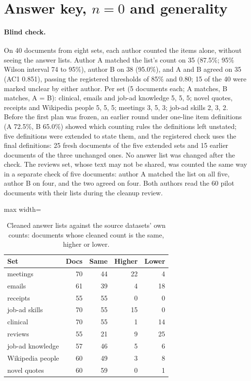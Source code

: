 \section{Answer key, $n = 0$ and generality}
\label{app:key}
\label{app:generality}

\paragraph{Blind check.}
On 40 documents from eight sets, each author counted the items alone, without seeing the answer lists.
Author A matched the list's count on 35 (87.5\%; 95\% Wilson interval 74 to 95\%), author B on 38 (95.0\%), and A and B agreed on 35 (AC1 0.851), passing the registered thresholds of 85\% and 0.80; 15 of the 40 were marked unclear by either author.
Per set (5 documents each; A matches, B matches, A = B): clinical, emails and job-ad knowledge 5, 5, 5; novel quotes, receipts and Wikipedia people 5, 5, 5; meetings 3, 5, 3; job-ad skills 2, 3, 2.
Before the first plan was frozen, an earlier round under one-line item definitions (A 72.5\%, B 65.0\%) showed which counting rules the definitions left unstated; five definitions were extended to state them, and the registered check uses the final definitions: 25 fresh documents of the five extended sets and 15 earlier documents of the three unchanged ones.
No answer list was changed after the check.
The reviews set, whose text may not be shared, was counted the same way in a separate check of five documents: author A matched the list on all five, author B on four, and the two agreed on four.
Both authors read the 60 pilot documents with their lists during the cleanup review.

\begin{table}[t]
  \centering
  \small
  \begin{adjustbox}{max width=\linewidth}
  \begin{tabular}{@{}lrrrr@{}}
    \toprule
    Set & Docs & Same & Higher & Lower \\
    \midrule
    meetings & 70 & 44 & 22 & 4 \\
    emails & 61 & 39 & 4 & 18 \\
    receipts & 55 & 55 & 0 & 0 \\
    job-ad skills & 70 & 55 & 15 & 0 \\
    clinical & 70 & 55 & 1 & 14 \\
    reviews & 55 & 21 & 9 & 25 \\
    job-ad knowledge & 57 & 46 & 5 & 6 \\
    Wikipedia people & 60 & 49 & 3 & 8 \\
    novel quotes & 60 & 59 & 0 & 1 \\
    \bottomrule
  \end{tabular}
  \end{adjustbox}
  \caption{Cleaned answer lists against the source datasets' own counts: documents whose cleaned count is the same, higher or lower.}
  \label{tab:keysource}
\end{table}

